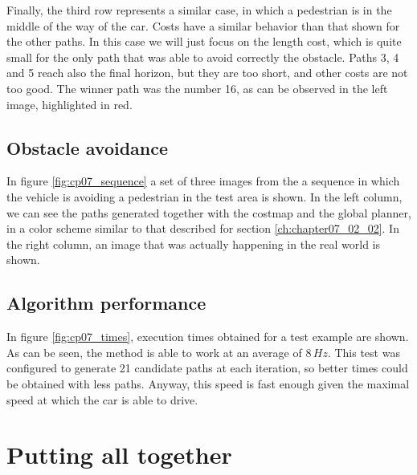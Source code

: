 Finally, the third row represents a similar case, in which a pedestrian is in the middle of the way of the car. Costs have a similar behavior than that shown for the other paths. In this case we will just focus on the length cost, which is quite small for the only path that was able to avoid correctly the obstacle. Paths 3, 4 and 5 reach also the final horizon, but they are too short, and other costs are not too good. The winner path was the number 16, as can be observed in the left image, highlighted in red.

\subsection{Obstacle avoidance}\label{ch:chapter07_02_03}

In figure \ref{fig:cp07_sequence} a set of three images from the a sequence in which the vehicle is avoiding a pedestrian in the test area is shown. In the left column, we can see the paths generated together with the costmap and the global planner, in a color scheme similar to that described for section \ref{ch:chapter07_02_02}. In the right column, an image that was actually happening in the real world is shown.

\subsection{Algorithm performance}\label{ch:chapter07_02_04}

In figure \ref{fig:cp07_times}, execution times obtained for a test example are shown. As can be seen, the method is able to work at an average of $8\,Hz$. This test was configured to generate 21 candidate paths at each iteration, so better times could be obtained with less paths. Anyway, this speed is fast enough given the maximal speed at which the car is able to drive.

\FloatBarrier

\section{Putting all together}\label{ch:chapter08_08}

